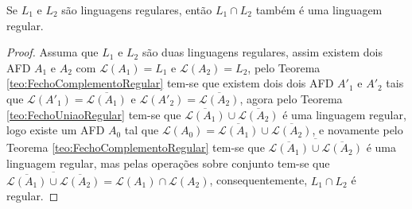 \begin{theorem}\label{teo:FechoIntersecaoRegular}
	Se $L_1$ e $L_2$ são linguagens regulares, então $L_1 \cap L_2$ também é uma linguagem regular.
\end{theorem}

\begin{proof}
	Assuma que $L_1$ e $L_2$ são duas linguagens regulares, assim existem dois AFD $A_1$ e $A_2$ com $\mathcal{L}(A_1) = L_1$ e $\mathcal{L}(A_2) = L_2$, pelo Teorema \ref{teo:FechoComplementoRegular} tem-se que existem dois dois AFD $A'_1$ e $A'_2$ tais que $\mathcal{L}(A'_1) = \overline{\mathcal{L}(A_1)}$ e $\mathcal{L}(A'_2) = \overline{\mathcal{L}(A_2)}$, agora pelo Teorema \ref{teo:FechoUniaoRegular} tem-se que $\overline{\mathcal{L}(A_1)} \cup \overline{\mathcal{L}(A_2)}$ é uma linguagem regular, logo existe um AFD $A_0$ tal que $\mathcal{L}(A_0) = \overline{\mathcal{L}(A_1)} \cup \overline{\mathcal{L}(A_2)}$, e novamente pelo Teorema \ref{teo:FechoComplementoRegular} tem-se que $\overline{\overline{\mathcal{L}(A_1)} \cup \overline{\mathcal{L}(A_2)}}$ é uma linguagem regular, mas pelas operações sobre conjunto tem-se que $\overline{\overline{\mathcal{L}(A_1)} \cup \overline{\mathcal{L}(A_2)}} = \mathcal{L}(A_1) \cap \mathcal{L}(A_2)$, consequentemente, $L_1 \cap L_2$ é regular.
\end{proof}